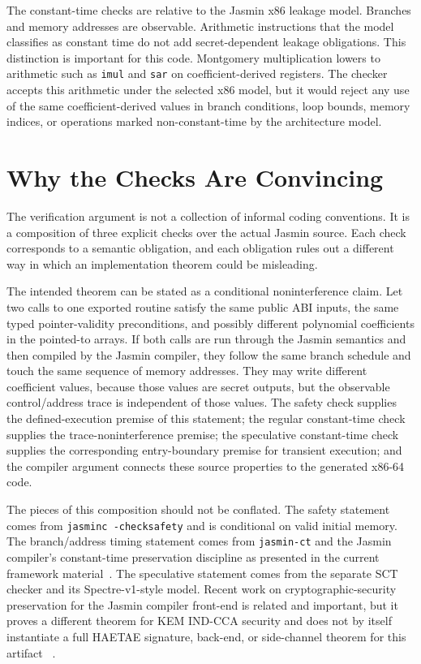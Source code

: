 \documentclass[10pt,twocolumn]{article}
\newcommand{\jasmin}{Jasmin}
\newcommand{\ct}{constant-time}
\begin{document}
The \ct{} checks are relative to the \jasmin{} x86 leakage model.  Branches and
memory addresses are observable.  Arithmetic instructions that the model
classifies as constant time do not add secret-dependent leakage obligations.
This distinction is important for this code.  Montgomery multiplication lowers
to arithmetic such as \texttt{imul} and \texttt{sar} on coefficient-derived
registers.  The checker accepts this arithmetic under the selected x86 model,
but it would reject any use of the same coefficient-derived values in branch
conditions, loop bounds, memory indices, or operations marked non-\ct{} by the
architecture model.

\section{Why the Checks Are Convincing}

The verification argument is not a collection of informal coding conventions.
It is a composition of three explicit checks over the actual \jasmin{} source.
Each check corresponds to a semantic obligation, and each obligation rules out a
different way in which an implementation theorem could be misleading.

The intended theorem can be stated as a conditional noninterference claim.  Let
two calls to one exported routine satisfy the same public ABI inputs, the same
typed pointer-validity preconditions, and possibly different polynomial
coefficients in the pointed-to arrays.  If both calls are run through the
\jasmin{} semantics and then compiled by the \jasmin{} compiler, they follow the
same branch schedule and touch the same sequence of memory addresses.  They may
write different coefficient values, because those values are secret outputs, but
the observable control/address trace is independent of those values.  The
safety check supplies the defined-execution premise of this statement; the
regular \ct{} check supplies the trace-noninterference premise; the speculative
\ct{} check supplies the corresponding entry-boundary premise for transient
execution; and the compiler argument connects these source properties to the
generated x86-64 code.

The pieces of this composition should not be conflated.  The safety statement
comes from \texttt{jasminc -checksafety} and is conditional on valid initial
memory.  The branch/address timing statement comes from \texttt{jasmin-ct} and
the \jasmin{} compiler's \ct{} preservation discipline as presented in the
current framework material~\cite{JasminFramework2026}.  The speculative
statement comes from the separate SCT checker and its Spectre-v1-style model.
Recent work on cryptographic-security preservation for the \jasmin{} compiler
front-end is related and important, but it proves a different theorem for KEM
IND-CCA security and does not by itself instantiate a full HAETAE signature,
back-end, or side-channel theorem for this artifact
~\cite{ArranzOlmos2025JasminSecurity}.
\end{document}
